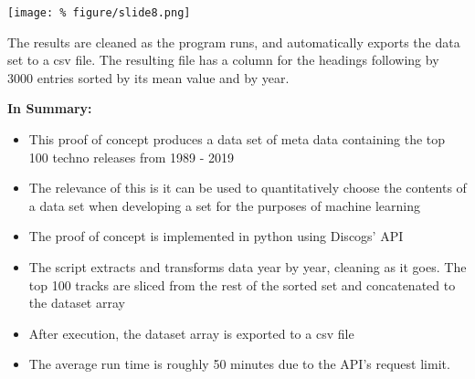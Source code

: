 \documentclass[unknownkeysallowed,usepdftitle=false, parskip=full]{beamer}
\newcommand{\secvariable}{nothing}
\newcommand{\mysection}[1]{\renewcommand{\secvariable}{#1}
}
\begin{document}
\mysection{Results}
\begin{frame}\label{\secvariable}
\begin{center}
\texttt{[image: \%
figure/slide8.png]}
\end{center}
\vspace{-0.2cm}

The results are cleaned as the program runs, and automatically exports the data set to a csv file. The resulting file has a column for the headings following by 3000 entries sorted by its mean value and by year.

\end{frame}


\mysection{conclusion}
\begin{frame}\label{\secvariable}
\textbf{In Summary:}
\begin{itemize}
    \item This proof of concept produces a data set of meta data containing the top 100 techno releases from 1989 - 2019
    \item The relevance of this is it can be used to quantitatively choose the contents of a data set when developing a set for the purposes of machine learning
    \item The proof of concept is implemented in python using Discogs' API
    \item The script extracts and transforms data year by year, cleaning as it goes. The top 100 tracks are sliced from the rest of the sorted set and concatenated to the dataset array
    \item After execution, the dataset array is exported to a csv file
    \item The average run time is roughly 50 minutes due to the API's request limit.
\end{itemize}
  
\end{frame}
\end{document}
